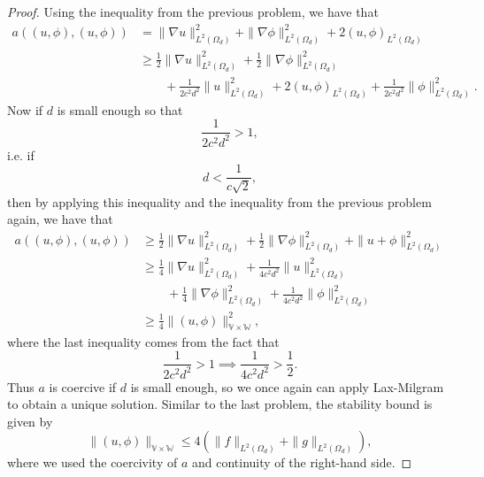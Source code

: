 \documentclass{article}
\begin{document}
\begin{enumerate}
\begin{proof}
		      Using the inequality from the previous problem, we have that
		      \begin{align*}
			      a((u,\phi),(u,\phi)) & = \|\nabla u\|_{L^2(\Omega_d)}^2 + \|\nabla \phi\|_{L^2(\Omega_d)}^2 + 2(u,\phi)_{L^2(\Omega_d)}                             \\
			                           & \geq \frac{1}{2}\|\nabla u\|_{L^2(\Omega_d)}^2 + \frac{1}{2}\|\nabla \phi\|_{L^2(\Omega_d)}^2                                \\
			                           & \qquad + \frac{1}{2c^2d^2}\|u\|_{L^2(\Omega_d)}^2 + 2(u,\phi)_{L^2(\Omega_d)} + \frac{1}{2c^2d^2}\|\phi\|_{L^2(\Omega_d)}^2.
		      \end{align*}
		      Now if $d$ is small enough so that \[\frac{1}{2c^2d^2} > 1,\]
		      i.e. if \[d < \frac{1}{c\sqrt{2}},\]
		      then by applying this inequality and the inequality from the previous problem again, we have that
		      \begin{align*}
			      a((u,\phi),(u,\phi)) & \geq \frac{1}{2}\|\nabla u\|_{L^2(\Omega_d)}^2 + \frac{1}{2}\|\nabla \phi\|_{L^2(\Omega_d)}^2 + \|u+\phi\|_{L^2(\Omega_d)}^2 \\
			                           & \geq \frac{1}{4}\|\nabla u\|_{L^2(\Omega_d)}^2 + \frac{1}{4c^2d^2}\|u\|_{L^2(\Omega_d)}^2                                    \\
			                           & \qquad + \frac{1}{4}\|\nabla \phi\|_{L^2(\Omega_d)}^2 + \frac{1}{4c^2d^2}\|\phi\|_{L^2(\Omega_d)}^2                          \\
			                           & \geq \frac{1}{4}\|(u,\phi)\|_{\mathbb V \times \mathbb W}^2,
		      \end{align*}
		      where the last inequality comes from the fact that \[\frac{1}{2c^2d^2} > 1 \implies \frac{1}{4c^2d^2} > \frac{1}{2}.\]
		      Thus $a$ is coercive if $d$ is small enough, so we once again can apply Lax-Milgram to obtain a unique solution.
		      Similar to the last problem, the stability bound is given by
		      \[\|(u,\phi)\|_{\mathbb V \times \mathbb W} \leq 4(\|f\|_{L^2(\Omega_d)} + \|g\|_{L^2(\Omega_d)}),\]
		      where we used the coercivity of $a$ and continuity of the right-hand side.
	      \end{proof}
\end{enumerate}
\end{document}
